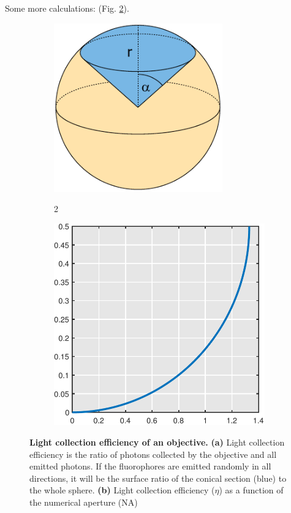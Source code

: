 \documentclass{diploma_style}
\begin{document}
Some more calculations: (Fig. \ref{fig:light_effb}).

\begin{figure}[tpb]
\begin{subfigure}[t]{0.49\textwidth}
	\centering
	\includegraphics[page=1,width=0.8\textwidth]{figures/2_DualMouse/efficiency/sphere}
	\caption{\textbf{}}
	\label{fig:light_effa}2
\end{subfigure}
\begin{subfigure}[t]{0.49\textwidth}
	\centering
	\includegraphics[page=1,width=1\textwidth]{figures/2_DualMouse/efficiency/light_eff}
	\caption{\textbf{}}
	\label{fig:light_effb}
\end{subfigure} 
 \caption{\textbf{Light collection efficiency of an objective.} \textbf{(a)} Light collection efficiency is the ratio of photons collected by the objective and all emitted photons. If the fluorophores are emitted randomly in all directions, it will be the surface ratio of the conical section (blue) to the whole sphere. \textbf{(b)} Light collection efficiency ($\eta$) as a function of the numerical aperture (NA)}
 \label{fig:light_eff}
\end{figure}
\end{document}
